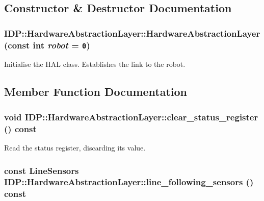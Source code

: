 \subsection{Constructor \& Destructor Documentation}
\hypertarget{classIDP_1_1HardwareAbstractionLayer_424d40bbaed459f571b46dbb45bb8576}{
\subsubsection[{HardwareAbstractionLayer}]{\setlength{\rightskip}{0pt plus 5cm}IDP::HardwareAbstractionLayer::HardwareAbstractionLayer (const int {\em robot} = {\tt 0})}}
\label{classIDP_1_1HardwareAbstractionLayer_424d40bbaed459f571b46dbb45bb8576}


Initialise the HAL class. Establishes the link to the robot. 

\subsection{Member Function Documentation}
\hypertarget{classIDP_1_1HardwareAbstractionLayer_1902d9260758777966ab362e21f3be42}{
\subsubsection[{clear\_\-status\_\-register}]{\setlength{\rightskip}{0pt plus 5cm}void IDP::HardwareAbstractionLayer::clear\_\-status\_\-register () const}}
\label{classIDP_1_1HardwareAbstractionLayer_1902d9260758777966ab362e21f3be42}


Read the status register, discarding its value. \hypertarget{classIDP_1_1HardwareAbstractionLayer_ca143d627de2ff9942069ad922d17ee5}{
\subsubsection[{line\_\-following\_\-sensors}]{\setlength{\rightskip}{0pt plus 5cm}const {\bf LineSensors} IDP::HardwareAbstractionLayer::line\_\-following\_\-sensors () const}}
\label{classIDP_1_1HardwareAbstractionLayer_ca143d627de2ff9942069ad922d17ee5}


